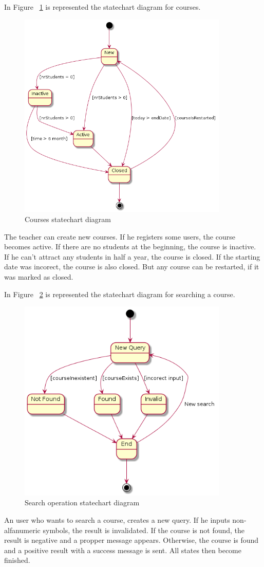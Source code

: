 \documentclass[12pt,a4paper,titlepage]{article}
\begin{document}
In Figure ~\ref{fig:6courses} is represented the statechart diagram for courses.
\begin{figure}[H]
\centering
	\includegraphics[width=10cm]{6courses}
	\caption{Courses statechart diagram}
	\label{fig:6courses}
\end{figure}
The teacher can create new courses. If he registers some users, the course becomes active. If there are no students at the beginning, the course is inactive. If he can't attract any students in half a year, the course is closed. If the starting date was incorect, the course is also closed. But any course can be restarted, if it was marked as closed.

In Figure ~\ref{fig:6search} is represented the statechart diagram for searching a course.
\begin{figure}[H]
\centering
\includegraphics[width=10cm]{6search}
\caption{Search operation statechart diagram}
\label{fig:6search}
\end{figure}
An user who wants to search a course, creates a new query. If he inputs non-alfanumeric symbols, the result is invalidated. If the course is not found, the result is negative and a propper message appears. Otherwise, the course is found and a positive result with a success message is sent. All states then become finished.
\end{document}

